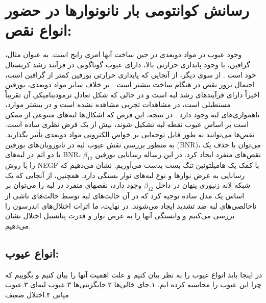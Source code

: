 
\section{رسانش کوانتو‌‌می‌‌ بار نانونوارها در حضور انواع نقص:}
وجود عیوب در مواد دوبعدی در حین ساخت آنها امری رایج است. به عنوان مثال، گرافین، با وجود پایداری حرارتی بالا، دارای عیوب گوناگونی در فرآیند رشد کریستال خود است \cite{Xu2018Structural,Kotakoski2011From}. از سوی دیگر، از آنجایی که پایداری حرارتی ‌بورفین کمتر از گرافین است، احتمال بروز نقص در هنگام ساخت بیشتر است \cite{Frawley1994Real}. بر خلاف سایر مواد دوبعدی، ‌بورفین اخیراً دارای فرآیندهای رشد لبه است و در حالی که شکل تعادل ترمودینا‌میکی آن تقریباً مستطیلی است، در مشاهدات تجربی مشاهده نشده است و در بیشتر موارد، ناهمواری‌های لبه وجود دارد \cite{Koster1954Wave}. در نتیجه، این فرض که اشکال‌ها لبه‌های متنوعی از ممکن است بر اساس عیوب نقطه لبه تشکیل شوند، بیش از یک فرض نظری ساده است. نقص‌ها ‌‌می‌‌توانند به طور قابل توجه‌ایی بر خواص الکترونی مواد دوبعدی تأثیر بگذارند. به منظور بررسی نقش عیوب لبه در نانوروبان‌های ‌بورفین (\gls{BNR})، ‌می‌‌توان با حذف یک یا دو اتم در لبه‌های \gls{BNR}، نقص‌های منفرد ایجاد کرد. در این رساله رسانایی ‌بورفین $\beta_{12}$ را با روش \gls{NEGF} با کمک یک‌ ها‌میلتونین \gls{تنگ بست} بدست ‌‌می‌‌آوریم. نشان ‌می‌دهیم که رسانایی به عرض نوارها و نوع لبه‌های نوار بستگی دارد. همچنین، از آنجایی که یک شبکه لانه زنبوری پنهان در داخل $\beta_{12}$ وجود دارد، نقصهای منفرد در لبه را ‌می‌‌توان بر اساس یک مدل ساده توجیه کرد که در آن حالت‌های لبه توسط حالت‌های ناشی از ناخالصی‌های لبه ضد تشدید ایجاد ‌می‌شوند. در نهایت، ما اثرات اختلال‌های اندرسون را بررسی ‌می‌‌کنیم و وابستگی آنها را به عرض نوار و قدرت پتانسیل اختلال نشان ‌می‌‌دهیم.
\subsection{انواع عیوب:}
در اینجا باید انواع عیوب را به نظر بیان کنیم و علت اهمیت آنها را بیان کنیم و بگوییم که چرا این عیوب را محاسبه کرده ایم.
۱.جای خالی‌ها 
۲.جایگزینی‌ها 
۳.عیوب لبه‌ای 
۳.عیوب ‌میانی 
۴.اختلال ضعیف

